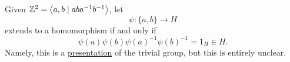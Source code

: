 \begin{eg}
	Given \(\mathbb{\MakeUppercase{z}} ^2 = \left< a, b \mid aba^{-1} b^{-1}  \right> \), let
	\[
		\psi \colon \{a, b\}\to H
	\]
	extends to a homomorphism if and only if
	\[
		\psi (a)\psi (b)\psi (a)^{-1} \psi (b)^{-1} = 1_H\in H.
	\]
	Namely, this is a \hyperref[def:group-presentation]{presentation} of the trivial group, but this is entirely unclear.
\end{eg}